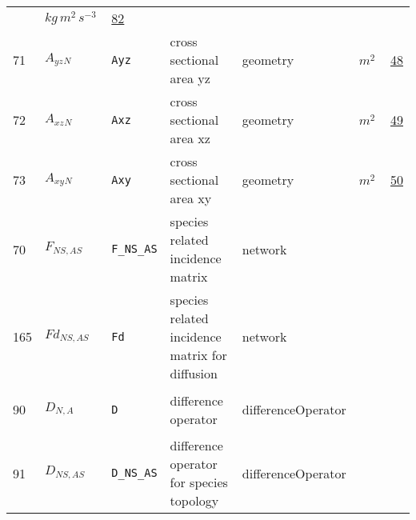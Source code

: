 \begin{longtable}{|p{1cm}|p{2.5cm}|p{4.5cm}|p{8cm}|p{3.0cm}|p{3cm}|p{1cm}|}
             & $ kg \,m^{2} \,s^{-3} \, $
             & \hyperlink{"e:82"}{ 82 }
                 \\
    71
             & \hypertarget{"v:71"}{ $ {{A_{yz}}}{_{N}} $}
             & \verb|Ayz|
             & cross sectional area yz
             & \begin{lay}geometry \end{lay}
             & $ m^{2} \, $
             & \hyperlink{"e:48"}{ 48 }
                 \\
    72
             & \hypertarget{"v:72"}{ $ {{A_{xz}}}{_{N}} $}
             & \verb|Axz|
             & cross sectional area xz
             & \begin{lay}geometry \end{lay}
             & $ m^{2} \, $
             & \hyperlink{"e:49"}{ 49 }
                 \\
    73
             & \hypertarget{"v:73"}{ $ {{A_{xy}}}{_{N}} $}
             & \verb|Axy|
             & cross sectional area xy
             & \begin{lay}geometry \end{lay}
             & $ m^{2} \, $
             & \hyperlink{"e:50"}{ 50 }
                 \\
    70
             & \hypertarget{"v:70"}{ $ {F}{_{{N S}, {A S}}} $}
             & \verb|F_NS_AS|
             & species related incidence matrix
             & \begin{lay}network \end{lay}
             & $  $
             & \\
    165
             & \hypertarget{"v:165"}{ $ {Fd}{_{{N S}, {A S}}} $}
             & \verb|Fd|
             & species related incidence matrix for diffusion
             & \begin{lay}network \end{lay}
             & $  $
             & \\
    90
             & \hypertarget{"v:90"}{ $ {D}{_{N, A}} $}
             & \verb|D|
             & difference operator
             & \begin{lay}differenceOperator \end{lay}
             & $  $
             & \\
    91
             & \hypertarget{"v:91"}{ $ {D}{_{{N S}, {A S}}} $}
             & \verb|D_NS_AS|
             & difference operator for species topology
             & \begin{lay}differenceOperator \end{lay}

\end{longtable}
